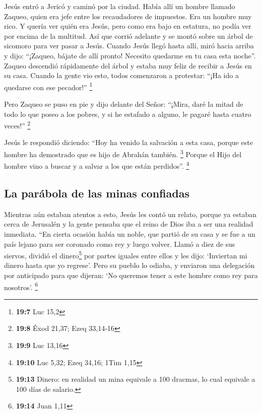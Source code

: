  Jesús entró a Jericó y caminó por la ciudad.
 Había allí un hombre llamado Zaqueo, quien era jefe entre
los recaudadores de impuestos. Era un hombre muy rico.  Y
quería ver quién era Jesús, pero como era bajo en estatura, no podía ver
por encima de la multitud.  Así que corrió adelante y se
montó sobre un árbol de sicomoro para ver pasar a Jesús. 
Cuando Jesús llegó hasta allí, miró hacia arriba y dijo: ``¡Zaqueo,
bájate de allí pronto! Necesito quedarme en tu casa esta noche''.
 Zaqueo descendió rápidamente del árbol y estaba muy feliz
de recibir a Jesús en su casa.  Cuando la gente vio esto,
todos comenzaron a protestar: ``¡Ha ido a quedarse con ese pecador!''
\footnote{\textbf{19:7} Luc 15,2}

 Pero Zaqueo se puso en pie y dijo delante del Señor:
``¡Mira, daré la mitad de todo lo que poseo a los pobres, y si he
estafado a alguno, le pagaré hasta cuatro veces!'' \footnote{\textbf{19:8}
  Éxod 21,37; Ezeq 33,14-16}

 Jesús le respondió diciendo: ``Hoy ha venido la salvación
a esta casa, porque este hombre ha demostrado que es hijo de Abrahán
también. \footnote{\textbf{19:9} Luc 13,16}  Porque el
Hijo del hombre vino a buscar y a salvar a los que están perdidos''.
\footnote{\textbf{19:10} Luc 5,32; Ezeq 34,16; 1Tim 1,15}

\hypertarget{la-paruxe1bola-de-las-minas-confiadas}{%
\subsection{La parábola de las minas
confiadas}\label{la-paruxe1bola-de-las-minas-confiadas}}

 Mientras aún estaban atentos a esto, Jesús les contó un
relato, porque ya estaban cerca de Jerusalén y la gente pensaba que el
reino de Dios iba a ser una realidad inmediata.  ``En
cierta ocasión había un noble, que partió de su casa y se fue a un país
lejano para ser coronado como rey y luego volver.  Llamó
a diez de sus siervos, dividió el dinero\footnote{\textbf{19:13} Dinero:
  en realidad un mina equivale a 100 dracmas, lo cual equivale a 100
  días de salario.} por partes iguales entre ellos y les dijo:
`Inviertan mi dinero hasta que yo regrese'.  Pero su
pueblo lo odiaba, y enviaron una delegación por anticipado para que
dijeran: `No queremos tener a este hombre como rey para nosotros'.
\footnote{\textbf{19:14} Juan 1,11}

